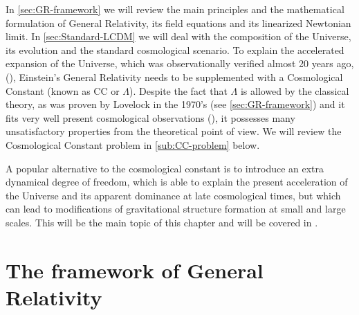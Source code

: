 In \cref{sec:GR-framework} we will review the main principles and the mathematical 
formulation of General Relativity, its field equations and
its linearized Newtonian limit.
In \cref{sec:Standard-LCDM} we will deal with the composition of the Universe,
its evolution and the standard cosmological scenario.
To explain the accelerated expansion of the Universe, which was observationally verified almost 20 years ago,
(\cite{cite, supernova, 1998}), Einstein's General Relativity needs to be supplemented with a Cosmological Constant (known as CC or $\Lambda$). Despite the fact that $\Lambda$ is allowed by the classical theory, as was proven by Lovelock in the 1970's (see \cref{sec:GR-framework}) and 
it fits very well present cosmological observations (), it
possesses many unsatisfactory properties from the theoretical point of view. 
We will review the Cosmological Constant problem in \cref{sub:CC-problem} below.

A popular alternative to the cosmological constant is to introduce an extra dynamical degree of freedom, which is able to explain the present acceleration of the Universe and its apparent dominance at late cosmological times, but which can lead 
to modifications of gravitational structure formation at small and large scales. This will
be the main topic of this chapter and will be covered in .




\section{The framework of General Relativity \label{sec:GR-framework}}


